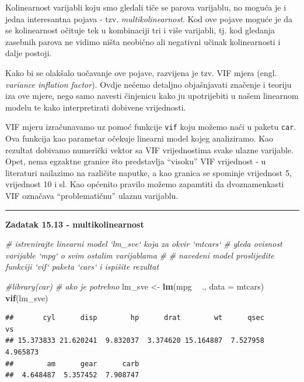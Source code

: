\documentclass[]{book}
\newenvironment{Shaded}{\begin{snugshade}}{\end{snugshade}}
\newcommand{\KeywordTok}[1]{\textcolor[rgb]{0.13,0.29,0.53}{\textbf{#1}}}
\newcommand{\DataTypeTok}[1]{\textcolor[rgb]{0.13,0.29,0.53}{#1}}
\newcommand{\StringTok}[1]{\textcolor[rgb]{0.31,0.60,0.02}{#1}}
\newcommand{\CommentTok}[1]{\textcolor[rgb]{0.56,0.35,0.01}{\textit{#1}}}
\newcommand{\OperatorTok}[1]{\textcolor[rgb]{0.81,0.36,0.00}{\textbf{#1}}}
\newcommand{\NormalTok}[1]{#1}
\theoremstyle{definition}
\theoremstyle{definition}
\theoremstyle{definition}
\theoremstyle{remark}
\begin{document}
Kolinearnost varijabli koju smo gledali tiče se parova varijablu, no
moguća je i jedna interesantna pojava - tzv. \emph{multikolinearnost}.
Kod ove pojave moguće je da se kolinearnost očituje tek u kombinaciji
tri i više varijabli, tj. kod gledanja zasebnih parova ne vidimo ništa
neobično ali negativni učinak kolinearnosti i dalje postoji.

Kako bi se olakšalo uočavanje ove pojave, razvijena je tzv. VIF mjera
(engl. \emph{variance inflation factor}). Ovdje nećemo detaljno
objašnjavati značenje i teoriju iza ove mjere, nego samo navesti
činjenicu kako ju upotrijebiti u našem linearnom modelu te kako
interpretirati dobivene vrijednosti.

VIF mjeru izračunavamo uz pomoć funkcije \texttt{vif} koju možemo naći u
paketu \texttt{car}. Ova funkcija kao parametar očekuje linearni model
kojeg analiziramo. Kao rezultat dobivamo numerički vektor sa VIF
vrijednostima svake ulazne varijable. Opet, nema egzaktne granice što
predstavlja ``visoku'' VIF vrijednost - u literaturi nailazimo na
različite naputke, a kao granica se spominje vrijednost 5, vrijednost 10
i sl. Kao općenito pravilo možemo zapamtiti da dvoznamenkasti VIF
označava ``problematičnu'' ulaznu varijablu.

\begin{center}\rule{0.5\linewidth}{\linethickness}\end{center}

\textbf{Zadatak 15.13 - multikolinearnost}

\begin{Shaded}
\begin{Highlighting}[]
\CommentTok{# istrenirajte linearni model `lm_sve` koja za okvir `mtcars`}
\CommentTok{# gleda ovisnost varijable `mpg` o svim ostalim varijablama}
\CommentTok{#}
\CommentTok{# navedeni model proslijedite funkciji `vif` paketa `cars` i ispišite rezultat}
\end{Highlighting}
\end{Shaded}

\begin{Shaded}
\begin{Highlighting}[]
\CommentTok{#library(car)  # ako je potrebno}
\NormalTok{lm_sve <-}\StringTok{ }\KeywordTok{lm}\NormalTok{(mpg }\OperatorTok{~}\StringTok{ }\NormalTok{., }\DataTypeTok{data =}\NormalTok{ mtcars)}
\KeywordTok{vif}\NormalTok{(lm_sve)}
\end{Highlighting}
\end{Shaded}

\begin{verbatim}
##       cyl      disp        hp      drat        wt      qsec        vs 
## 15.373833 21.620241  9.832037  3.374620 15.164887  7.527958  4.965873 
##        am      gear      carb 
##  4.648487  5.357452  7.908747
\end{verbatim}
\end{document}
